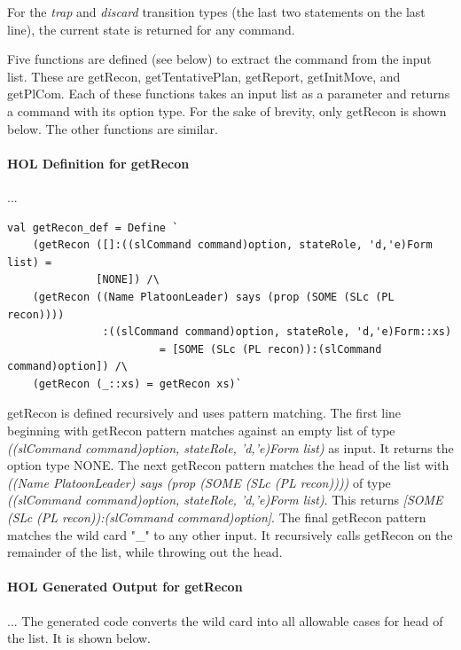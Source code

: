 \documentclass[../../main/main.tex]{subfiles}
\begin{document}
For the \textit{trap} and \textit{discard} transition types (the last two statements on the last line), the current state is returned for any command. 

\HOLssmPlanPBTheoremsplanPBNSXXdef

Five functions are defined (see below) to extract the command from the input list.  These are getRecon, getTentativePlan, getReport, getInitMove, and getPlCom.  Each of these functions takes an input list as a parameter and returns a command with its option type.  For the sake of brevity, only getRecon is shown below.  The other functions are similar.

\paragraph*{HOL Definition for getRecon}...

\begin{lstlisting}
val getRecon_def = Define `
    (getRecon ([]:((slCommand command)option, stateRole, 'd,'e)Form list) =
    	      [NONE]) /\
    (getRecon ((Name PlatoonLeader) says (prop (SOME (SLc (PL recon))))
               :((slCommand command)option, stateRole, 'd,'e)Form::xs)
    	      	        = [SOME (SLc (PL recon)):(slCommand command)option]) /\
    (getRecon (_::xs) = getRecon xs)`
\end{lstlisting}

getRecon is defined recursively and uses pattern matching.  The first line beginning with getRecon pattern matches against an empty list of type \textit{((slCommand command)option, stateRole, 'd,'e)Form list)} as input.  It returns the option type NONE.  The next getRecon pattern matches the head of the list with \textit{((Name PlatoonLeader) says (prop (SOME (SLc (PL recon))))} of type  \textit{((slCommand command)option, stateRole, 'd,'e)Form list)}.  This returns \textit{[SOME (SLc (PL recon)):(slCommand command)option]}.  The final getRecon pattern matches the wild card "_" to any other input.  It recursively calls getRecon on the remainder of the list, while throwing out the head.

\paragraph*{HOL Generated Output for getRecon}...
The  generated code converts the wild card into all allowable cases for head of the list.  It is shown below.
\end{document}
